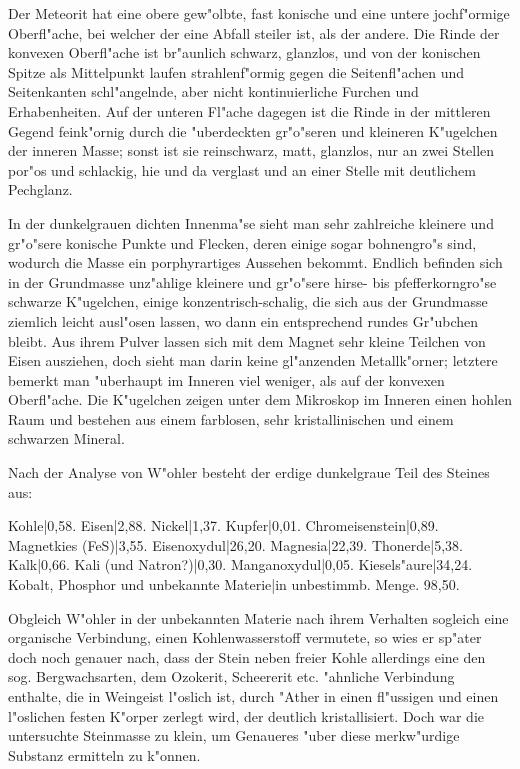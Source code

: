 \documentclass[a4paper, 11pt, oneside]{article}
\begin{document}
Der Meteorit hat eine obere gew"olbte, fast konische und eine untere jochf"ormige Oberfl"ache, bei welcher der eine Abfall steiler ist, als der andere. Die Rinde der konvexen Oberfl"ache ist br"aunlich schwarz, glanzlos, und von der konischen Spitze als Mittelpunkt laufen strahlenf"ormig gegen die Seitenfl"achen und Seitenkanten schl"angelnde, aber nicht kontinuierliche Furchen und Erhabenheiten. Auf der unteren Fl"ache dagegen ist die Rinde in der mittleren Gegend feink"ornig durch die "uberdeckten gr"o"seren und kleineren K"ugelchen der inneren Masse; sonst ist sie reinschwarz, matt, glanzlos, nur an zwei Stellen por"os und schlackig, hie und da verglast und an einer Stelle mit deutlichem Pechglanz.

In der dunkelgrauen dichten Innenma"se sieht man sehr zahlreiche kleinere und gr"o"sere konische Punkte und Flecken, deren einige sogar bohnengro"s sind, wodurch die Masse ein porphyrartiges Aussehen bekommt. Endlich befinden sich in der Grundmasse unz"ahlige kleinere und gr"o"sere hirse- bis pfefferkorngro"se schwarze K"ugelchen, einige konzentrisch-schalig, die sich aus der Grundmasse ziemlich leicht ausl"osen lassen, wo dann ein entsprechend rundes Gr"ubchen bleibt. Aus ihrem Pulver lassen sich mit dem Magnet sehr kleine Teilchen von Eisen ausziehen, doch sieht man darin keine gl"anzenden Metallk"orner; letztere bemerkt man "uberhaupt im Inneren viel weniger, als auf der konvexen Oberfl"ache. Die K"ugelchen zeigen unter dem Mikroskop im Inneren einen hohlen Raum und bestehen aus einem farblosen, sehr kristallinischen und einem schwarzen Mineral.

Nach der Analyse von W"ohler besteht der erdige dunkelgraue Teil des Steines aus:

Kohle|0,58.  
Eisen|2,88.  
Nickel|1,37.  
Kupfer|0,01.  
Chromeisenstein|0,89.  
Magnetkies (FeS)|3,55.  
Eisenoxydul|26,20.  
Magnesia|22,39.  
Thonerde|5,38.  
Kalk|0,66.  
Kali (und Natron?)|0,30.  
Manganoxydul|0,05.  
Kiesels"aure|34,24.  
Kobalt, Phosphor und unbekannte Materie|in unbestimmb. Menge.  
98,50.

Obgleich W"ohler in der unbekannten Materie nach ihrem Verhalten sogleich eine organische Verbindung, einen Kohlenwasserstoff vermutete, so wies er sp"ater doch noch genauer nach, dass der Stein neben freier Kohle allerdings eine den sog. Bergwachsarten, dem Ozokerit, Scheererit etc. "ahnliche Verbindung enthalte, die in Weingeist l"oslich ist, durch "Ather in einen fl"ussigen und einen l"oslichen festen K"orper zerlegt wird, der deutlich kristallisiert. Doch war die untersuchte Steinmasse zu klein, um Genaueres "uber diese merkw"urdige Substanz ermitteln zu k"onnen.
\end{document}

